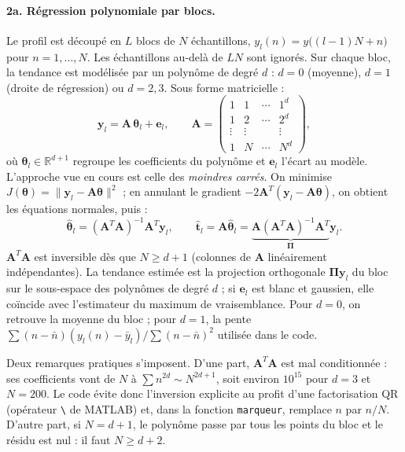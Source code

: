 \documentclass[11pt,a4paper]{article}
\begin{document}
\paragraph{2a. Régression polynomiale par blocs.}
Le profil est découpé en $L$ blocs de $N$ échantillons, $y_l(n) = y\big((l-1)N + n\big)$ pour $n = 1, \dots, N$. Les échantillons au-delà de $LN$ sont ignorés. Sur chaque bloc, la tendance est modélisée par un polynôme de degré $d$ : $d = 0$ (moyenne), $d = 1$ (droite de régression) ou $d = 2, 3$. Sous forme matricielle :
\begin{equation}
  \mathbf{y}_l = \mathbf{A}\, \boldsymbol{\theta}_l + \mathbf{e}_l,
  \qquad
  \mathbf{A} =
  \begin{pmatrix}
    1 & 1 & \cdots & 1^d \\
    1 & 2 & \cdots & 2^d \\
    \vdots & \vdots & & \vdots \\
    1 & N & \cdots & N^d
  \end{pmatrix},
  \label{eq:modele}
\end{equation}
où $\boldsymbol{\theta}_l \in \mathbb{R}^{d+1}$ regroupe les coefficients du polynôme et $\mathbf{e}_l$ l'écart au modèle. L'approche vue en cours est celle des \emph{moindres carrés}. On minimise $J(\boldsymbol{\theta}) = \|\mathbf{y}_l - \mathbf{A}\boldsymbol{\theta}\|^2$ ; en annulant le gradient $-2\mathbf{A}^T(\mathbf{y}_l - \mathbf{A}\boldsymbol{\theta})$, on obtient les équations normales, puis :
\begin{equation}
  \hat{\boldsymbol{\theta}}_l = \left(\mathbf{A}^T \mathbf{A}\right)^{-1} \mathbf{A}^T \mathbf{y}_l,
  \qquad
  \hat{\mathbf{t}}_l = \mathbf{A}\hat{\boldsymbol{\theta}}_l = \underbrace{\mathbf{A}\left(\mathbf{A}^T \mathbf{A}\right)^{-1} \mathbf{A}^T}_{\boldsymbol{\Pi}} \mathbf{y}_l.
  \label{eq:mc}
\end{equation}
$\mathbf{A}^T\mathbf{A}$ est inversible dès que $N \geq d+1$ (colonnes de $\mathbf{A}$ linéairement indépendantes). La tendance estimée est la projection orthogonale $\boldsymbol{\Pi}\mathbf{y}_l$ du bloc sur le sous-espace des polynômes de degré $d$ ; si $\mathbf{e}_l$ est blanc et gaussien, elle coïncide avec l'estimateur du maximum de vraisemblance. Pour $d = 0$, on retrouve la moyenne du bloc ; pour $d = 1$, la pente $\sum (n - \bar{n})(y_l(n) - \bar{y}_l) / \sum (n-\bar{n})^2$ utilisée dans le code.

Deux remarques pratiques s'imposent. D'une part, $\mathbf{A}^T\mathbf{A}$ est mal conditionnée : ses coefficients vont de $N$ à $\sum n^{2d} \sim N^{2d+1}$, soit environ $10^{15}$ pour $d = 3$ et $N = 200$. Le code évite donc l'inversion explicite au profit d'une factorisation QR (opérateur \texttt{\textbackslash} de MATLAB) et, dans la fonction \texttt{marqueur}, remplace $n$ par $n/N$. D'autre part, si $N = d+1$, le polynôme passe par tous les points du bloc et le résidu est nul : il faut $N \geq d+2$.
\end{document}
